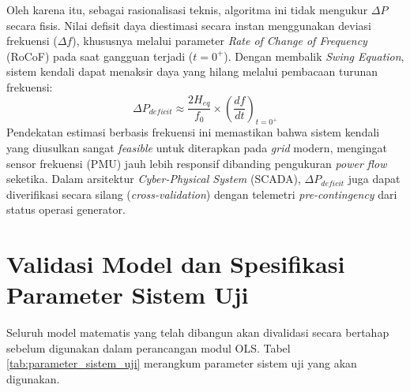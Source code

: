 Oleh karena itu, sebagai rasionalisasi teknis, algoritma ini tidak mengukur $\Delta P$ secara fisis. Nilai defisit daya diestimasi secara instan menggunakan deviasi frekuensi ($\Delta f$), khususnya melalui parameter \textit{Rate of Change of Frequency} (RoCoF) pada saat gangguan terjadi ($t=0^{+}$). Dengan membalik \textit{Swing Equation}, sistem kendali dapat menaksir daya yang hilang melalui pembacaan turunan frekuensi:
\begin{equation}
    \Delta P_{deficit} \approx \frac{2 H_{eq}}{f_{0}} \times \left( \frac{df}{dt} \right)_{t=0^{+}}
\end{equation}
Pendekatan estimasi berbasis frekuensi ini memastikan bahwa sistem kendali yang diusulkan sangat \textit{feasible} untuk diterapkan pada \textit{grid} modern, mengingat sensor frekuensi (PMU) jauh lebih responsif dibanding pengukuran \textit{power flow} seketika. Dalam arsitektur \textit{Cyber-Physical System} (SCADA), $\Delta P_{deficit}$ juga dapat diverifikasi secara silang (\textit{cross-validation}) dengan telemetri \textit{pre-contingency} dari status operasi generator.

\section{Validasi Model dan Spesifikasi Parameter Sistem Uji}
\label{sec:Validasi_Model}

Seluruh model matematis yang telah dibangun akan divalidasi secara bertahap sebelum digunakan dalam perancangan modul OLS. Tabel \ref{tab:parameter_sistem_uji} merangkum parameter sistem uji yang akan digunakan.

